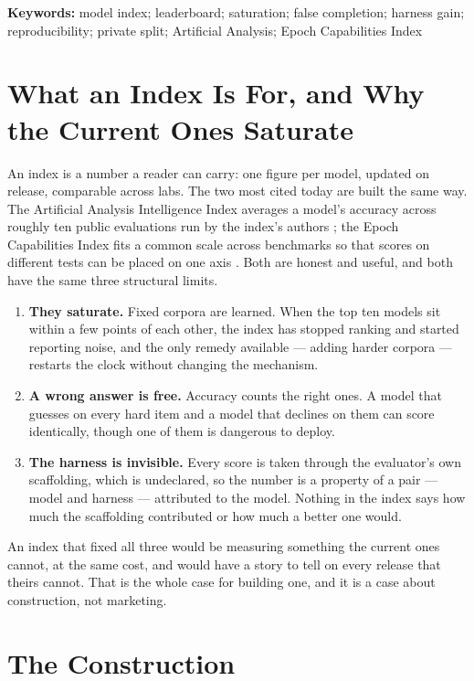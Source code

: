 \documentclass[11pt]{article}
\theoremstyle{definition}
\begin{document}
\noindent\textbf{Keywords:} model index; leaderboard; saturation; false completion; harness gain; reproducibility; private split; Artificial Analysis; Epoch Capabilities Index

\tableofcontents
\bigskip

\section{What an Index Is For, and Why the Current Ones Saturate}\label{sec:why}

An index is a number a reader can carry: one figure per model, updated on release, comparable across labs. The two most cited today are built the same way. The Artificial Analysis Intelligence Index averages a model's accuracy across roughly ten public evaluations run by the index's authors \citep{aa2026index}; the Epoch Capabilities Index fits a common scale across benchmarks so that scores on different tests can be placed on one axis \citep{epoch2026eci}. Both are honest and useful, and both have the same three structural limits.

\begin{enumerate}[leftmargin=*,itemsep=2pt]
\item \textbf{They saturate.} Fixed corpora are learned. When the top ten models sit within a few points of each other, the index has stopped ranking and started reporting noise, and the only remedy available --- adding harder corpora --- restarts the clock without changing the mechanism.
\item \textbf{A wrong answer is free.} Accuracy counts the right ones. A model that guesses on every hard item and a model that declines on them can score identically, though one of them is dangerous to deploy.
\item \textbf{The harness is invisible.} Every score is taken through the evaluator's own scaffolding, which is undeclared, so the number is a property of a pair --- model and harness --- attributed to the model. Nothing in the index says how much the scaffolding contributed or how much a better one would.
\end{enumerate}

An index that fixed all three would be measuring something the current ones cannot, at the same cost, and would have a story to tell on every release that theirs cannot. That is the whole case for building one, and it is a case about construction, not marketing.

\section{The Construction}\label{sec:construction}
\end{document}
